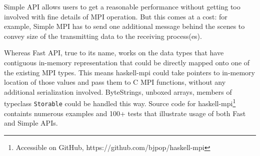 \documentclass{tmr}
\begin{document}
Simple API allows users to get a reasonable performance without
getting too involved with fine details of MPI operation. But this
comes at a cost: for example, Simple MPI has to send one additional
message behind the scenes to convey size of the transmitting data to
the receiving process(es).

Whereas Fast API, true to its name, works on the data types that have
contiguous in-memory representation that could be directly mapped onto
one of the existing MPI types. This means haskell-mpi could take
pointers to in-memory location of those values and pass them to C MPI
functions, without any additional serialization involved. ByteStrings,
unboxed arrays, members of typeclass \verb|Storable| could be handled
this way. Source code for haskell-mpi\footnote{Accessible on GitHub,
  https://github.com/bjpop/haskell-mpi} containts numerous examples
and 100+ tests that illustrate usage of both Fast and Simple APIs.

%
%
%
%
%
%
%
%
%
%
%
%
\end{document}
